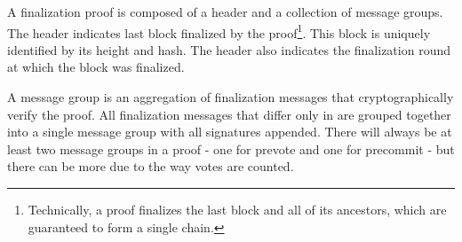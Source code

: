 \begin{figure}[H]
\end{figure}

A finalization proof is composed of a header and a collection of message groups.
The header indicates last block finalized by the proof\footnote{
	Technically, a proof finalizes the last block and all of its ancestors, which are guaranteed to form a single chain.
}.
This block is uniquely identified by its height and hash.
The header also indicates the finalization round at which the block was finalized.

A message group is an aggregation of finalization messages that cryptographically verify the proof.
All finalization messages that differ only in  are grouped together into a single message group with all signatures appended.
There will always be at least two message groups in a proof - one for prevote and one for precommit - but there can be more due to the way votes are counted.

